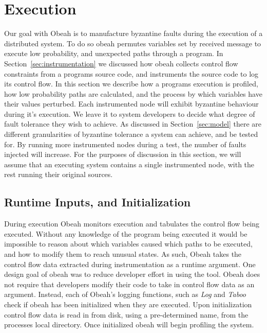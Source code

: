 \section{Execution}
\label{sec:execution}

Our goal with Obeah is to manufacture byzantine faults during the execution of
a distributed system. To do so obeah permutes variables set by received message
to execute low probability, and unexpected paths through a program. In
Section~\ref{sec:instrumentation} we discussed how obeah collects control flow
constraints from a programs source code, and instruments the source code to log
its control flow. In this section we describe how a programs execution is
profiled, how low probability paths are calculated, and the process by which
variables have their values perturbed.  Each instrumented node will exhibit
byzantine behaviour during it's execution. We leave it to system developers to
decide what degree of fault tolerance they wish to achieve. As discussed in
Section~\ref{sec:model} there are different granularities of byzantine
tolerance a system can achieve, and be tested for. By running more instrumented
nodes during a test, the number of faults injected will increase.  For the
purposes of discussion in this section, we will assume that an executing system
contains a single instrumented node, with the rest running their original
sources.

\subsection{Runtime Inputs, and Initialization}

During execution Obeah monitors execution and tabulates the control flow being
executed. Without any knowledge of the program being executed it would be
impossible to reason about which variables caused which paths to be executed,
and how to modify them to reach unusual states. As such, Obeah takes the control
flow data extracted during instrumentation as a runtime argument. One design
goal of obeah was to reduce developer effort in using the tool. Obeah does not
require that developers modify their code to take in control flow data as an
argument. Instead, each of Obeah's logging functions, such as \emph{Log} and
\emph{Taboo} check if obeah has been initialized when they are executed. Upon
initialization control flow data is read in from disk, using a pre-determined
name, from the processes local directory. Once initialized obeah will begin
profiling the system.

